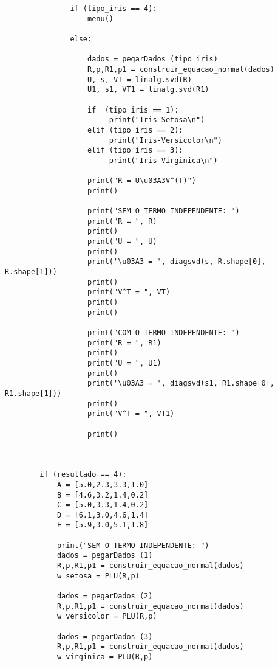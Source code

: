 \documentclass[a4paper,12pt,twoside]{article}
\begin{document}
\begin{lstlisting}
               if (tipo_iris == 4):
                   menu()
               
               else:
                
                   dados = pegarDados (tipo_iris)
                   R,p,R1,p1 = construir_equacao_normal(dados)
                   U, s, VT = linalg.svd(R)
                   U1, s1, VT1 = linalg.svd(R1)
                   
                   if  (tipo_iris == 1):
                        print("Iris-Setosa\n")
                   elif (tipo_iris == 2):
                        print("Iris-Versicolor\n")
                   elif (tipo_iris == 3):
                        print("Iris-Virginica\n")
                        
                   print("R = U\u03A3V^(T)")
                   print()
                   
                   print("SEM O TERMO INDEPENDENTE: ")
                   print("R = ", R)
                   print()
                   print("U = ", U)
                   print()
                   print('\u03A3 = ', diagsvd(s, R.shape[0], R.shape[1]))
                   print()
                   print("V^T = ", VT)
                   print()
                   print()
                    
                   print("COM O TERMO INDEPENDENTE: ")
                   print("R = ", R1)
                   print()
                   print("U = ", U1)
                   print()
                   print('\u03A3 = ', diagsvd(s1, R1.shape[0], R1.shape[1]))
                   print()
                   print("V^T = ", VT1)
                   
                   print()
                   
               
                
        if (resultado == 4):
            A = [5.0,2.3,3.3,1.0]
            B = [4.6,3.2,1.4,0.2]
            C = [5.0,3.3,1.4,0.2]
            D = [6.1,3.0,4.6,1.4]
            E = [5.9,3.0,5.1,1.8]
            
            print("SEM O TERMO INDEPENDENTE: ")
            dados = pegarDados (1)
            R,p,R1,p1 = construir_equacao_normal(dados)
            w_setosa = PLU(R,p)
            
            dados = pegarDados (2)
            R,p,R1,p1 = construir_equacao_normal(dados)
            w_versicolor = PLU(R,p)
        
            dados = pegarDados (3)
            R,p,R1,p1 = construir_equacao_normal(dados)
            w_virginica = PLU(R,p)
            

\end{lstlisting}
\end{document}
